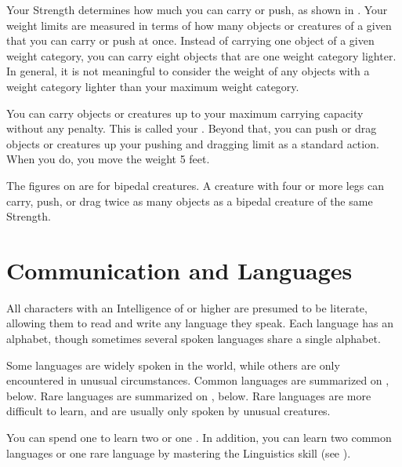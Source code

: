     Your Strength determines how much you can carry or push, as shown in .
    Your weight limits are measured in terms of how many objects or creatures of a given  that you can carry or push at once.
    Instead of carrying one object of a given weight category, you can carry eight objects that are one weight category lighter.
    In general, it is not meaningful to consider the weight of any objects with a weight category lighter than your maximum weight category.

    You can carry objects or creatures up to your maximum carrying capacity without any penalty.
    This is called your .
    Beyond that, you can push or drag objects or creatures up your pushing and dragging limit as a standard action.
    When you do, you move the weight 5 feet.

     The figures on  are for bipedal creatures.
    A creature with four or more legs can carry, push, or drag twice as many objects as a bipedal creature of the same Strength.

\section{Communication and Languages}\label{Languages}\label{Communication and Languages}

    All characters with an Intelligence of  or higher are presumed to be literate, allowing them to read and write any language they speak. Each language has an alphabet, though sometimes several spoken languages share a single alphabet.

    \label{Language Rarity}
    Some languages are widely spoken in the world, while others are only encountered in unusual circumstances.
    Common languages are summarized on , below.
    Rare languages are summarized on , below.
    Rare languages are more difficult to learn, and are usually only spoken by unusual creatures.

    \label{Learning Languages}
    You can spend one  to learn two  or one .
    In addition, you can learn two common languages or one rare language by mastering the Linguistics skill (see ).

